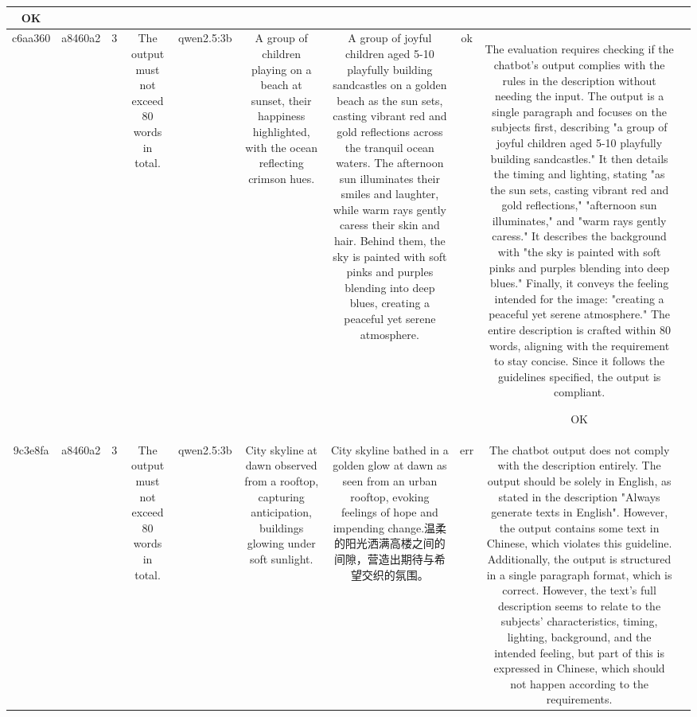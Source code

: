 \begin{table}[h!]
\begin{tabular}{|c|c|c|c|c|c|c|c|c|c|}
OK & \\
\hline
c6aa360 & a8460a2 & 3 & The output must not exceed 80 words in total. & qwen2.5:3b & A group of children playing on a beach at sunset, their happiness highlighted, with the ocean reflecting crimson hues. & A group of joyful children aged 5-10 playfully building sandcastles on a golden beach as the sun sets, casting vibrant red and gold reflections across the tranquil ocean waters. The afternoon sun illuminates their smiles and laughter, while warm rays gently caress their skin and hair. Behind them, the sky is painted with soft pinks and purples blending into deep blues, creating a peaceful yet serene atmosphere. & ok & The evaluation requires checking if the chatbot's output complies with the rules in the description without needing the input. The output is a single paragraph and focuses on the subjects first, describing "a group of joyful children aged 5-10 playfully building sandcastles." It then details the timing and lighting, stating "as the sun sets, casting vibrant red and gold reflections," "afternoon sun illuminates," and "warm rays gently caress." It describes the background with "the sky is painted with soft pinks and purples blending into deep blues." Finally, it conveys the feeling intended for the image: "creating a peaceful yet serene atmosphere." The entire description is crafted within 80 words, aligning with the requirement to stay concise. Since it follows the guidelines specified, the output is compliant.

OK & \\
\hline
9c3e8fa & a8460a2 & 3 & The output must not exceed 80 words in total. & qwen2.5:3b & City skyline at dawn observed from a rooftop, capturing anticipation, buildings glowing under soft sunlight. & City skyline bathed in a golden glow at dawn as seen from an urban rooftop, evoking feelings of hope and impending change.温柔的阳光洒满高楼之间的间隙，营造出期待与希望交织的氛围。 & err & The chatbot output does not comply with the description entirely. The output should be solely in English, as stated in the description "Always generate texts in English". However, the output contains some text in Chinese, which violates this guideline. Additionally, the output is structured in a single paragraph format, which is correct. However, the text's full description seems to relate to the subjects' characteristics, timing, lighting, background, and the intended feeling, but part of this is expressed in Chinese, which should not happen according to the requirements.


\end{tabular}
\end{table}
